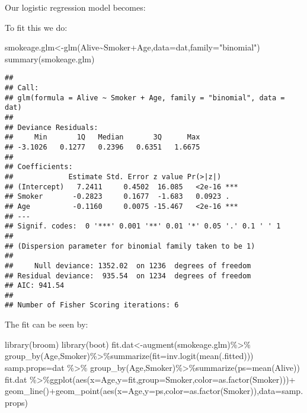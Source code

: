 \documentclass[
]{article}
\newenvironment{Shaded}{\begin{snugshade}}{\end{snugshade}}
\newcommand{\AttributeTok}[1]{\textcolor[rgb]{0.77,0.63,0.00}{#1}}
\newcommand{\FunctionTok}[1]{\textcolor[rgb]{0.00,0.00,0.00}{#1}}
\newcommand{\NormalTok}[1]{#1}
\newcommand{\OtherTok}[1]{\textcolor[rgb]{0.56,0.35,0.01}{#1}}
\newcommand{\SpecialCharTok}[1]{\textcolor[rgb]{0.00,0.00,0.00}{#1}}
\newcommand{\StringTok}[1]{\textcolor[rgb]{0.31,0.60,0.02}{#1}}
\begin{document}
Our logistic regression model becomes:

\vspace{1.5in}

To fit this we do:

\begin{Shaded}
\begin{Highlighting}[]
\NormalTok{smokeage.glm}\OtherTok{\textless{}{-}}\FunctionTok{glm}\NormalTok{(Alive}\SpecialCharTok{\textasciitilde{}}\NormalTok{Smoker}\SpecialCharTok{+}\NormalTok{Age,}\AttributeTok{data=}\NormalTok{dat,}\AttributeTok{family=}\StringTok{"binomial"}\NormalTok{)}
\FunctionTok{summary}\NormalTok{(smokeage.glm)}
\end{Highlighting}
\end{Shaded}

\begin{verbatim}
## 
## Call:
## glm(formula = Alive ~ Smoker + Age, family = "binomial", data = dat)
## 
## Deviance Residuals: 
##     Min       1Q   Median       3Q      Max  
## -3.1026   0.1277   0.2396   0.6351   1.6675  
## 
## Coefficients:
##             Estimate Std. Error z value Pr(>|z|)    
## (Intercept)   7.2411     0.4502  16.085   <2e-16 ***
## Smoker       -0.2823     0.1677  -1.683   0.0923 .  
## Age          -0.1160     0.0075 -15.467   <2e-16 ***
## ---
## Signif. codes:  0 '***' 0.001 '**' 0.01 '*' 0.05 '.' 0.1 ' ' 1
## 
## (Dispersion parameter for binomial family taken to be 1)
## 
##     Null deviance: 1352.02  on 1236  degrees of freedom
## Residual deviance:  935.54  on 1234  degrees of freedom
## AIC: 941.54
## 
## Number of Fisher Scoring iterations: 6
\end{verbatim}

The fit can be seen by:

\begin{Shaded}
\begin{Highlighting}[]
\FunctionTok{library}\NormalTok{(broom)}
\FunctionTok{library}\NormalTok{(boot)}
\NormalTok{fit.dat}\OtherTok{\textless{}{-}}\FunctionTok{augment}\NormalTok{(smokeage.glm)}\SpecialCharTok{\%\textgreater{}\%} 
\FunctionTok{group\_by}\NormalTok{(Age,Smoker)}\SpecialCharTok{\%\textgreater{}\%}\FunctionTok{summarize}\NormalTok{(}\AttributeTok{fit=}\FunctionTok{inv.logit}\NormalTok{(}\FunctionTok{mean}\NormalTok{(.fitted)))}
\NormalTok{samp.props}\OtherTok{=}\NormalTok{dat }\SpecialCharTok{\%\textgreater{}\%} \FunctionTok{group\_by}\NormalTok{(Age,Smoker)}\SpecialCharTok{\%\textgreater{}\%}\FunctionTok{summarize}\NormalTok{(}\AttributeTok{ps=}\FunctionTok{mean}\NormalTok{(Alive))}
\NormalTok{fit.dat }\SpecialCharTok{\%\textgreater{}\%}\FunctionTok{ggplot}\NormalTok{(}\FunctionTok{aes}\NormalTok{(}\AttributeTok{x=}\NormalTok{Age,}\AttributeTok{y=}\NormalTok{fit,}\AttributeTok{group=}\NormalTok{Smoker,}\AttributeTok{color=}\FunctionTok{as.factor}\NormalTok{(Smoker)))}\SpecialCharTok{+}
  \FunctionTok{geom\_line}\NormalTok{()}\SpecialCharTok{+}\FunctionTok{geom\_point}\NormalTok{(}\FunctionTok{aes}\NormalTok{(}\AttributeTok{x=}\NormalTok{Age,}\AttributeTok{y=}\NormalTok{ps,}\AttributeTok{color=}\FunctionTok{as.factor}\NormalTok{(Smoker)),}\AttributeTok{data=}\NormalTok{samp.props)}
\end{Highlighting}
\end{Shaded}
\end{document}
